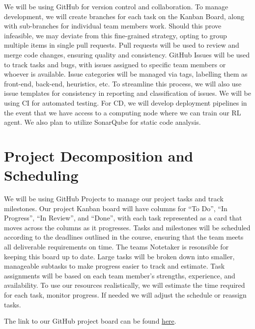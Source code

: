 \documentclass{article}
\begin{document}
\raggedright
We will be using GitHub for version control and collaboration.
To manage development, we will create branches for each task on the Kanban Board,
along with sub-branches for individual team members work.
Should this prove infeasible, we may deviate from this fine-grained strategy, opting to group multiple items in single pull requests.
Pull requests will be used to review and merge code changes, ensuring quality and
consistency. GitHub Issues will be used to track tasks and bugs, with 
issues assigned to specific team members or whoever is available.
Issue categories will be managed via tags, labelling them as front-end, back-end, heuristics, etc.
To streamline this process, we will also use issue templates for 
consistency in reporting and classification of issues.  We will be
using CI for automated testing. For CD, we will develop deployment pipelines in the
event that we have access to a computing node where we can train our RL agent.
We also plan to utilize SonarQube for static code analysis.

\section{Project Decomposition and Scheduling}


\raggedright
We will be using GitHub Projects to manage our project tasks and 
track milestones. Our project Kanban board will have columns for ``To Do'', ``In Progress'', ``In Review'',
and ``Done'', with each task represented as a card that moves across the columns as it progresses. Tasks
and milestones will be scheduled according to the deadlines outlined in the course, ensuring that
the team meets all deliverable requirements on time. The teams Notetaker is resonsible for keeping
this board up to date. Large tasks will be broken down into smaller,
manageable subtasks to make progress easier to track and estimate. Task assignments will be based
on each team member’s strengths, experience, and availability. To use our resources realistically,
we will estimate the time required for each task, monitor progress. If needed we will adjust the
schedule or reassign tasks.

\medskip
The link to our GitHub project board can be found \href{https://github.com/users/SY3141/projects/1}{here}.
\end{document}
